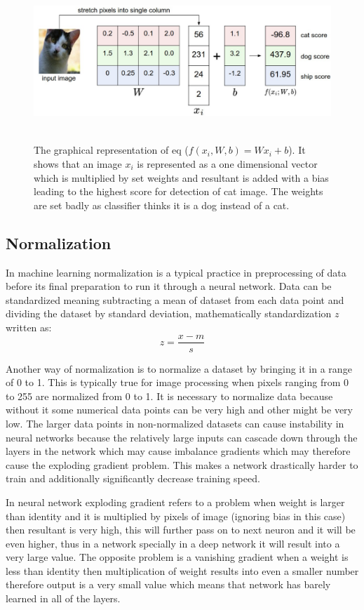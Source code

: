 \documentclass[11pt]{article}
\begin{document}
\begin{figure}[H]
	\includegraphics[width=145mm,height=60mm,  scale=0.8]{files/cnn_architecture/linear_class.png}
	\caption{The graphical representation of eq 
		($f(x_i, W, b) = Wx_i + b$). It shows that an image $x_i$ is represented as a one dimensional vector which is multiplied by set weights and resultant is added with a bias leading to the highest score for detection of cat image. The weights are set badly as classifier thinks it is a dog instead of a cat.}
	\label{fig: linear classifier}
\end{figure}

\subsection{Normalization}
In machine learning normalization is a typical practice in preprocessing of data before its final preparation to run it through a neural network. Data can be standardized meaning subtracting a mean of dataset from each data point and dividing the dataset by standard deviation, mathematically standardization $z$ written as:
$$ z = \dfrac{x-m}{s}$$

Another way of normalization is to normalize a dataset by bringing it in a range of 0 to 1. This is typically true for image processing when pixels ranging from 0 to 255 are normalized from 0 to 1. It is necessary to normalize data because without it some numerical data points can be very high and other might be very low. The larger data points in non-normalized datasets can cause instability in neural networks because the relatively large inputs can cascade down through the layers in the network which may cause imbalance gradients which may therefore cause the exploding gradient problem. This makes a network drastically harder to train and additionally significantly decrease training speed.

In neural network exploding gradient refers to a problem when weight is larger than identity and it is multiplied by pixels of image (ignoring bias in this case) then resultant is very high, this will further pass on to next neuron and it will be even higher, thus in a network specially in a deep network it will result into a very large value. The opposite problem is a vanishing gradient when a weight is less than identity then multiplication of weight results into even a smaller number therefore output is a very small value which means that network has barely learned in all of the layers.
\end{document}
